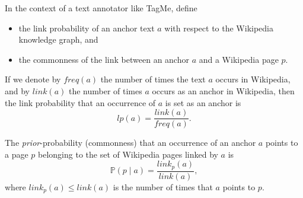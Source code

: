 \exercise

In the context of a text annotator like TagMe, define
%
\begin{itemize}
  \item the link probability of an anchor text $a$ with respect to the Wikipedia
    knowledge graph, and
  \item the commonness of the link between an anchor $a$ and a Wikipedia page
    $p$.
\end{itemize}

\solution
\label{13_annotators:tagme}

If we denote by $freq(a)$ the number of times the text $a$ occurs in Wikipedia,
and by $link(a)$ the number of times $a$ occurs as an anchor in Wikipedia, then
the link probability that an occurrence of $a$ is set as an anchor is
%
$$lp(a)=\frac{link(a)}{freq(a)}.$$

The \emph{prior}-probability (commonness) that an occurrence of an anchor $a$
points to a page $p$ belonging to the set of Wikipedia pages linked by $a$ is
%
$$\mathbb{P}(p \mid a)=\frac{link_p(a)}{link(a)},$$
%
where $link_p(a) \leq link(a)$ is the number of times that $a$ points to
$p$.
